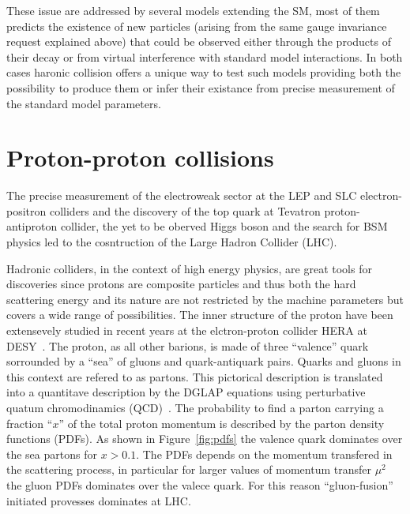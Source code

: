 These issue are addressed by several models extending the SM, most of them predicts the existence of new particles
(arising from the same gauge invariance request explained above) that could be observed either through the
products of their decay or from virtual interference with standard model interactions.
In both cases haronic collision offers a unique way to test such models providing both the possibility
to produce them or infer their existance from precise measurement of the standard model parameters.

\section{Proton-proton collisions}
The precise measurement of the electroweak sector at the LEP and SLC electron-positron colliders and the discovery of the top
quark at Tevatron proton-antiproton collider, the yet to be oberved Higgs boson and the search for BSM physics led
to the cosntruction of the Large Hadron Collider (LHC).

Hadronic colliders, in the context of high energy physics, are great tools for discoveries since
protons are composite particles and thus both the hard scattering energy and its nature are not restricted by
the machine parameters but covers a wide range of possibilities.
The inner structure of the proton have been extensevely studied in recent years at the elctron-proton collider HERA
at DESY~\cite{hera}. The proton, as all other barions, is made of three ``valence'' quark sorrounded by a ``sea''
of gluons and quark-antiquark pairs. Quarks and gluons in this context are refered to as partons. 
This pictorical description is translated into a quantitave description by the DGLAP equations using perturbative
quatum chromodinamics (QCD)~\cite{altarelli_parisi,gribov,dokshitzer}.
The probability to find a parton carrying a fraction ``$x$'' of the total proton momentum
is described by the parton density functions (PDFs).
As shown in Figure~\ref{fig:pdfs} the valence quark dominates over the sea partons for $x>0.1$.
The PDFs depends on the momentum transfered in the scattering process, in particular for
larger values of momentum transfer $\mu^2$ the gluon PDFs dominates over the valece quark. For this reason
``gluon-fusion'' initiated provesses dominates at LHC.

